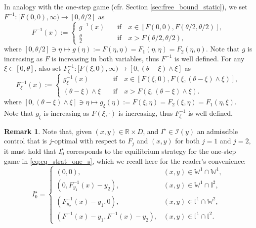\documentclass[10pt]{article}
\numberwithin{equation}{section}
\theoremstyle{plain}
\numberwithin{theorem}{section}
\theoremstyle{definition}
\newtheorem{remark}[theorem]{Remark}
\def \R {\mathbb{R}}
\newcommand{\<}{\langle}
\renewcommand{\>}{\rangle}
\renewcommand{\(}{\left(}
\renewcommand{\)}{\right)}
\def \R  {{\mathbb {R}}}
\def \R {{\mathbb {R}}}
\def\cI{{\mathcal I}}
\begin{document}
{{{{In analogy with the one-step game (cfr. Section \ref{sec:free_bound_static}), we set ${F}^{-1}:[F(0,0),\infty)\to {[0,\theta/2]}$ as
\begin{equation}\label{eq:invF_dyn}
{F}^{-1}(x):= \begin{cases}
g^{-1}(x) &\quad \text{if}\quad x\in [{F}(0,0),{F}(\theta/2,\theta/2)],\\ %
\frac{\theta}{2} & \quad \text{if}\quad x> F(\theta/2,\theta/2 ),%
\end{cases}
\end{equation}
where $[0,\theta/2]\ni \eta \mapsto g(\eta) := F(\eta,\eta) = F_1(\eta,\eta) = F_2(\eta,\eta)$. Note that $g$ is increasing as $F$ is increasing in both variables, thus $F^{-1}$ is well defined. 
{For any $\xi\in [0,\theta]$, also set
${F}_{\xi}^{-1}:[F(\xi,0),\infty)\to [0,(\theta-\xi)\wedge \xi]$} as
\begin{equation}\label{eq:invFi_dyn}
{F}_{\xi}^{-1}(x):= \begin{cases}
g_{\xi}^{-1}(x) &\quad \text{if}\quad x\in [{{F}(\xi,0),{F}({\xi,(\theta-\xi)\wedge \xi})}],\\ 
(\theta-\xi) \wedge \xi  & \quad \text{if}\quad x> {{F}({\xi,(\theta-\xi)\wedge \xi})}.
\end{cases}
\end{equation}
where $[0,(\theta-\xi) \wedge \xi]\ni \eta \mapsto g_{\xi}(\eta) := F(\xi,\eta) = F_2(\xi,\eta) = F_1(\eta,\xi)$. Note that $g_{\xi}$ is increasing as $F(\xi,\cdot)$ is increasing, thus $F_{\xi}^{-1}$ is well defined. 
\begin{remark}
Note that, given $(x,y)\in \R\times D$, and $I^{\star}\in \cI(y)$ an admissible control that is {$j$-optimal with respect to $F_j$ and $(x,y)$} for both $j=1$ and $j=2$, it must hold that $I^{\star}_0$ corresponds to the equilibrium strategy for the one-step game in \eqref{eq:eq_strat_one_s}, which we recall here for the reader's convenience:
\begin{equation}\label{eq:rep_I0_opt}
I^{\star}_0=\begin{cases}
(0,0), & (x,y)\in \mathbb{W}^1\cap \mathbb{W}^1,\\
(0, {F}^{-1}_{y_1}(x)-y_2), & (x,y)\in \mathbb{W}^1\cap \mathbb{I}^2, \\
({F}^{-1}_{y_2}(x)-y_1 , 0), & (x,y)\in \mathbb{I}^1\cap \mathbb{W}^2, \\
({F}^{-1}(x)-y_1, {F}^{-1}(x)-y_2), & (x,y)\in \mathbb{I}^1\cap \mathbb{I}^2.
\end{cases}
\end{equation}
\end{remark}

}}}}
\end{document}
